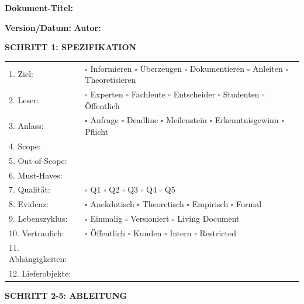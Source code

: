 \documentclass[12pt,a4paper]{article}
\begin{document}
\begin{tcolorbox}[colback=white, colframe=black, 
    title=\textbf{DOCUMENT SPECIFICATION CARD}]

\textbf{Dokument-Titel:} \hrulefill

\textbf{Version/Datum:} \hrulefill \hspace{2cm} \textbf{Autor:} \hrulefill

\tcblower

\textbf{SCHRITT 1: SPEZIFIKATION}

\begin{tabular}{@{}p{3cm}p{10cm}@{}}
1. Ziel: & $\square$ Informieren $\square$ Überzeugen $\square$ Dokumentieren $\square$ Anleiten $\square$ Theoretisieren \\[0.5em]
2. Leser: & $\square$ Experten $\square$ Fachleute $\square$ Entscheider $\square$ Studenten $\square$ Öffentlich \\[0.5em]
3. Anlass: & $\square$ Anfrage $\square$ Deadline $\square$ Meilenstein $\square$ Erkenntnisgewinn $\square$ Pflicht \\[0.5em]
4. Scope: & \hrulefill \\[0.5em]
5. Out-of-Scope: & \hrulefill \\[0.5em]
6. Must-Haves: & \hrulefill \\[0.5em]
7. Qualität: & $\square$ Q1 $\square$ Q2 $\square$ Q3 $\square$ Q4 $\square$ Q5 \\[0.5em]
8. Evidenz: & $\square$ Anekdotisch $\square$ Theoretisch $\square$ Empirisch $\square$ Formal \\[0.5em]
9. Lebenszyklus: & $\square$ Einmalig $\square$ Versioniert $\square$ Living Document \\[0.5em]
10. Vertraulich: & $\square$ Öffentlich $\square$ Kunden $\square$ Intern $\square$ Restricted \\[0.5em]
11. Abhängigkeiten: & \hrulefill \\[0.5em]
12. Lieferobjekte: & \hrulefill \\
\end{tabular}

\tcblower

\textbf{SCHRITT 2-5: ABLEITUNG}


\end{tcolorbox}
\end{document}
